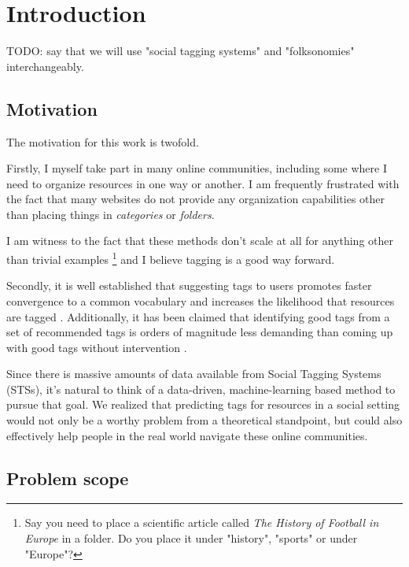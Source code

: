\chapter{Introduction}\label{chap:intro}

{\color{red} TODO: say that we will use "social tagging systems" and "folksonomies" interchangeably. }

\section{Motivation}\label{section:intro_motivation}

The motivation for this work is twofold. 

Firstly, I myself take part in many online communities, including some where I need to organize resources in one way or another. I am frequently frustrated with the fact that many websites do not provide any organization capabilities other than placing things in \textit{categories} or \textit{folders}.

I am witness to the fact that these methods don't scale at all for anything other than trivial examples \footnote{Say you need to place a scientific article called \textit{The History of Football in Europe} in a folder. Do you place it under "history", "sports" or under "Europe"?} and I believe tagging is a good way forward.

Secondly, it is well established that suggesting tags to users promotes faster convergence to a common vocabulary \citep{marlow_etal_2006,hassan_etal_2009, dattolo_etal_2010} and increases the likelihood that resources are tagged \citep{dattolo_etal_2010,floeck_etal_2010}. Additionally, it has been claimed that identifying good tags from a set of recommended tags is orders of magnitude less demanding than coming up with good tags without intervention \citep{marinho_etal_2012}.

Since there is massive amounts of data available from Social Tagging Systems (STSs), it's natural to think of a data-driven, machine-learning based method to pursue that goal. We realized that predicting tags for resources in a social setting would not only be a worthy problem from a theoretical standpoint, but could also effectively help people in the real world navigate these online communities.

\section{Problem scope}\label{section:intro_problem}

